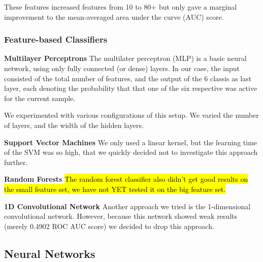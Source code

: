 \documentclass[10pt, a4paper]{article}
\begin{document}
\begin{multicols}{2}
		These features increased features from 10 to 80+ but only gave a marginal improvement to the mean-averaged area under the curve (AUC) score.
		
		\subsubsection{Feature-based Classifiers}
		\label{sec:classifiers}
		\textbf{Multilayer Perceptrons}
		The multilater perceptron (MLP) is a basic neural network, using only fully connected (or dense) layers. In our case, the input consisted of the total number of features, and the output of the 6 classis as last layer, each denoting the probability that that one of the six respective was active for the current sample. 
		
		We experimented with various configurations of this setup. We varied the number of layers, and the width of the hidden layers.
		
		
		\textbf{Support Vector Machines}
		We only used a linear kernel, but the learning time of the SVM was so high, that we quickly decided not to investigate this approach further.
		
		\textbf{Random Forests}
		\hl{The random forest classifier also didn't get good results on the small feature set, we have not YET tested it on the big feature set.}
		
		\textbf{1D Convolutional Network}
		Another approach we tried is the 1-dimensional convolutional network. However, because this network showed weak results (merely 0.4902 ROC AUC score) we decided to drop this approach.
		
		\subsection{Neural Networks}
		

\end{multicols}
\end{document}
